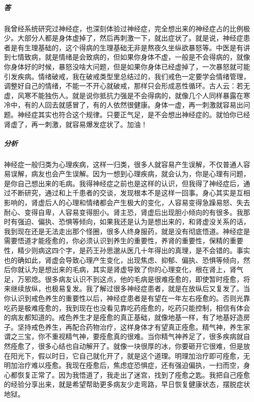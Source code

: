 \documentclass{ctexart}
\begin{document}
\begin{enumerate}
\begin{quote}
    \end{quote}
    \subparagraph{答} 我曾经系统研究过神经症，也深刻体验过神经症，完全想出来的神经症占的比例极少。大部分人都是身体虚掉了，然后再刺激一下，就出症状了。就是说，神经症患者是有生理基础的，这个得病的生理基础无非是熬夜久坐纵欲暴怒等。中医是有讲到七情致病，就是情绪是会致病的，但如果你身体不虚，一般是不会得病的，就像你身体好的时候，暴怒没啥大问题，但是如果你身体已经虚掉了，一次暴怒就可能引发疾病。情绪破戒，我在破戒类型里总结过的，我们戒色一定要学会情绪管理，调整好自己的情绪，不能一不开心就破戒，那样只会形成恶性循环。古人云：若无虚，风寒不能独伤人。就是说你抵抗力强是不会得病的，就像几个人同样暴露在寒冷中，有的人回去就感冒了，有的人依然很健康。身体一虚，再一刺激就容易出问题。神经症其实也符合这个规律。只要正气足，是不会想出神经症的。就怕你已经肾虚了，再一刺激，就容易爆发症状了。加油！
    \subparagraph{分析} 神经症一般归类为心理疾病，这样一归类，很多人就容易产生误解，不仅普通人容易误解，病友也会产生误解。因为一想到心理疾病，就会认为，你是心理有问题，是你自己想出来的毛病。我得神经症之前也是这样的认识，但我得了神经症后，通过不断研究，通过和上千患者的交谈，发现根本不是这样一回事。身心其实是互相影响的，肾虚后人的心理和情绪都会产生极大的变化，人容易变得急躁易怒、失去耐心、变得自卑，人容易变得胆小。肾主恐，肾虚后出现胆小倾向的有很多。我那时有强迫、偏执、恐惧等倾向，如果我还是认为是想出来的，和肾虚没关系的话，我到现在还是无法走出那个怪圈，很多人终身服药，就是没有彻底悟道。神经症是需要悟道才能痊愈的，你必须认识到养生的重要性，养肾的重要性，保精的重要性，精少则病这四个字，是药王孙思邈从医几十年得出的真理，是不会错的。事实也的确如此，肾虚会导致心理产生变化，出现焦虑、抑郁、偏执、恐惧等倾向，然后你就认为是想出来的毛病，其实是肾虚导致了你的心理变化，根在肾上，肾气足，万邪熄。很多病友认识不到这点，他的毛病是很难痊愈的，即使暂时痊愈，将来继续放纵，也极易复发。我了解过很多神经症患者，就是在放纵后又复发了。当你认识到戒色养生的重要性以后，神经症患者是有望在一年左右痊愈的。否则光靠吃药是极难痊愈的，我到现在也没看见靠吃药痊愈的，吃药只能控制，相信有体会的病友都知道的。戒色养生才是痊愈的真正基础，就像地基一样，有了地基好造房子。坚持戒色养生，再配合药物治疗，这样身体才有望真正痊愈。精气神，养生家谓之三宝，你不重视精气神，要痊愈真的很难。当你精气神养足了，很多疾病就自然痊愈了，很多心结也自动解开了。就像一块很厚的冰，你要砸开它很难，但是放在阳光下，假以时日，它自己就化开了，就是这个道理。明理加治疗即可痊愈，无明加治疗难以痊愈。我现在痊愈后，焦虑症恐惧症，还有强迫偏执，一扫而空，身心都恢复正常了。因为我悟道了，我走出了迷宫，找到了痊愈之匙。我把自己痊愈的经验分享出来，就是希望帮助更多病友少走弯路，早日恢复健康状态，摆脱症状地狱。
\end{enumerate}
\end{document}
